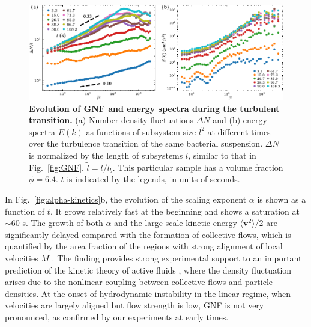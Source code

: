 \begin{figure}[!ht]
\begin{center}
\includegraphics[width=5.5in]{figs/5-GNF/8.pdf}
\caption[Evolution of GNF and Energy Spectra during the Turbulent Transition]
{
\textbf{Evolution of GNF and energy spectra during the turbulent transition.} (a) Number density fluctuations $\Delta N$ and (b) energy spectra $E(k)$ as functions of subsystem size $l^2$ at different times over the turbulence transition of the same bacterial suspension. $\Delta N$ is normalized by the length of subsystems $l$, similar to that in Fig.~\ref{fig:GNF}. $\tilde{l} = l/l_b$. This particular sample has a volume fraction $\phi=6.4$. $t$ is indicated by the legends, in units of seconds.
}
\label{fig:GNF-energy-spectra-kinetics}
\end{center}
\end{figure}

In Fig.~\ref{fig:alpha-kinetics}b, the evolution of the scaling exponent $\alpha$ is shown as a function of $t$. It grows relatively fast at the beginning and shows a saturation at $\sim 60$ s. The growth of both $\alpha$ and the large scale kinetic energy $\langle \bm{v}^2 \rangle/2$ are significantly delayed compared with the formation of collective flows, which is quantified by the area fraction of the regions with strong alignment of local velocities $M$ \cite{Peng2020}.
The finding provides strong experimental support to an important prediction of the kinetic theory of active fluids \cite{Saintillan2008a,Saintillan2008b}, where the density fluctuation arises due to the nonlinear coupling between collective flows and particle densities. At the onset of hydrodynamic instability in the linear regime, when velocities are largely aligned but flow strength is low, GNF is not very pronounced, as confirmed by our experiments at early times.

